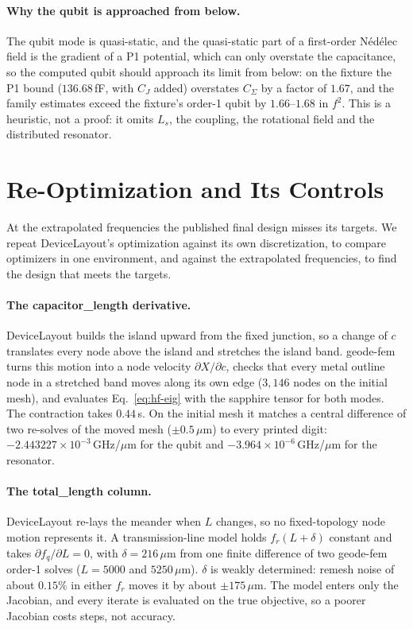 \documentclass{anvil-paper}
\begin{document}
\paragraph{Why the qubit is approached from below.}
The qubit mode is quasi-static, and the quasi-static part of a first-order
N\'ed\'elec field is the gradient of a P1 potential, which can only
overstate the capacitance, so the computed qubit should approach its limit
from below: on the fixture the P1 bound ($136.68$\,fF, with $C_J$ added)
overstates $C_\Sigma$ by a factor of $1.67$, and the family estimates exceed
the fixture's order-1 qubit by $1.66$--$1.68$ in $f^2$. This is a heuristic, not a proof: it omits $L_s$,
the coupling, the rotational field and the distributed resonator.

\section{Re-Optimization and Its Controls}
\label{sec:reopt}

At the extrapolated frequencies the published final design misses its
targets. We repeat DeviceLayout's optimization against its own
discretization, to compare optimizers in one environment, and against the
extrapolated frequencies, to find the design that meets the targets.

\paragraph{The capacitor\_length derivative.}
DeviceLayout builds the island upward from the fixed junction, so a change
of $c$ translates every node above the island and stretches the island
band. geode-fem turns this motion into a node velocity
$\partial X/\partial c$, checks that every metal outline node in a
stretched band moves along its own edge ($3{,}146$ nodes on the initial
mesh), and evaluates Eq.~\eqref{eq:hf-eig} with the sapphire tensor for both modes.
The contraction takes $0.44$\,s. On the initial mesh it matches a central
difference of two re-solves of the moved mesh ($\pm0.5\,\mu$m) to every
printed digit: $-2.443227\times10^{-3}$\,GHz/$\mu$m for the qubit and
$-3.964\times10^{-6}$\,GHz/$\mu$m for the resonator.

\paragraph{The total\_length column.}
DeviceLayout re-lays the meander when $L$ changes, so no fixed-topology
node motion represents it. A transmission-line model holds $f_r(L+\delta)$
constant and takes $\partial f_q/\partial L = 0$, with $\delta =
216\,\mu$m from one finite difference of two geode-fem order-1 solves
($L = 5000$ and $5250\,\mu$m). $\delta$ is weakly determined: remesh noise
of about $0.15\%$ in either $f_r$ moves it by about $\pm175\,\mu$m. The
model enters only the Jacobian, and every iterate is evaluated on the true
objective, so a poorer Jacobian costs steps, not accuracy.
\end{document}
